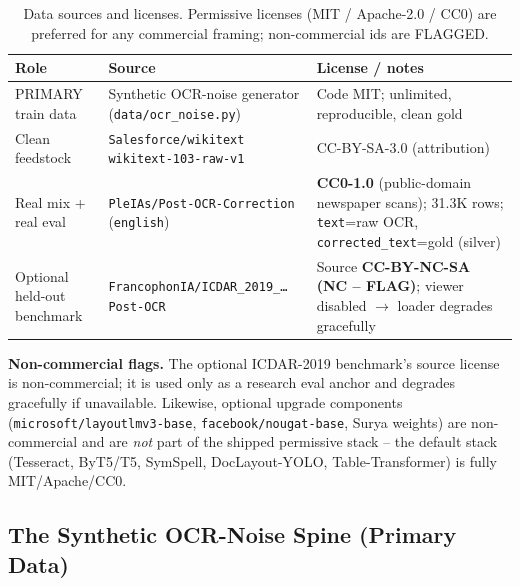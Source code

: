 \documentclass[12pt,a4paper]{article}
\begin{document}
\begin{table}[H]
\centering
\caption{Data sources and licenses. Permissive licenses (MIT / Apache-2.0 / CC0) are preferred for any commercial framing; non-commercial ids are FLAGGED.}
\small
\begin{tabularx}{\linewidth}{@{} l l L @{}}
\toprule
\textbf{Role} & \textbf{Source} & \textbf{License / notes} \\
\midrule
PRIMARY train data & Synthetic OCR-noise generator (\texttt{data/ocr\_noise.py}) & Code MIT; unlimited, reproducible, clean gold \\
Clean feedstock & \texttt{Salesforce/wikitext} \texttt{wikitext-103-raw-v1} & CC-BY-SA-3.0 (attribution) \\
Real mix + real eval & \texttt{PleIAs/Post-OCR-Correction} (\texttt{english}) & \textbf{CC0-1.0} (public-domain newspaper scans); 31.3K rows; \texttt{text}=raw OCR, \texttt{corrected\_text}=gold (silver) \\
Optional held-out benchmark & \texttt{FrancophonIA/ICDAR\_2019\_\dots Post-OCR} & Source \textbf{CC-BY-NC-SA (NC -- FLAG)}; viewer disabled $\rightarrow$ loader degrades gracefully \\
\bottomrule
\end{tabularx}
\end{table}

\noindent\textbf{Non-commercial flags.} The optional ICDAR-2019 benchmark's source license is non-commercial; it is used only as a research eval anchor and degrades gracefully if unavailable. Likewise, optional upgrade components (\texttt{microsoft/layoutlmv3-base}, \texttt{facebook/nougat-base}, Surya weights) are non-commercial and are \emph{not} part of the shipped permissive stack -- the default stack (Tesseract, ByT5/T5, SymSpell, DocLayout-YOLO, Table-Transformer) is fully MIT/Apache/CC0.

\subsection{The Synthetic OCR-Noise Spine (Primary Data)}
\end{document}
